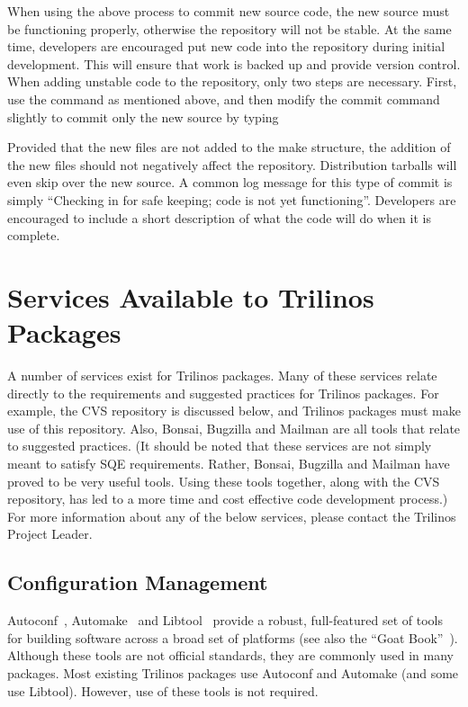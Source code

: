 \documentclass[12pt,relax]{TrilinosDevGuide}
\begin{document}
\begin{enumerate}
When using the above process to commit new source code, the new source must 
be functioning properly, otherwise the repository will not be stable.  
At the same time, developers are encouraged put new code into the repository 
during initial development.  This will ensure that work is backed up and 
provide version control.  When adding unstable code to the repository, only
two steps are necessary.  First, use the  command as 
mentioned above, and then modify the commit command slightly to commit only 
the new source by typing


Provided that the new files are not added to the make structure, the addition 
of the new files should not negatively affect the repository.  Distribution 
tarballs will even skip over the new source.  A common log message for this 
type of commit is simply ``Checking in for safe keeping; code is not yet 
functioning''.  Developers are encouraged to include a short description of 
what the code will do when it is complete.
\end{enumerate}

\section{Services Available to Trilinos Packages}
\label{Section:AvailableServices}
A number of services exist for Trilinos packages.  Many of these services 
relate directly to the requirements and suggested practices for Trilinos 
packages.  For example, the CVS repository is discussed below, and 
Trilinos packages must make use of this repository.  Also, Bonsai, Bugzilla 
and Mailman are all tools that relate to suggested practices.  (It should be 
noted that these services are not simply meant to satisfy SQE requirements.  
Rather, Bonsai, Bugzilla and Mailman have proved to be very useful tools.  
Using these tools together, along with the CVS repository, has led to a more 
time and cost effective code development process.)  For more information about 
any of the below services, please contact the Trilinos Project Leader.

\subsection{Configuration Management}
Autoconf~\cite{Autoconf},  Automake~\cite{Automake} and Libtool~\cite{Libtool} 
provide a robust, full-featured set of tools for building software across a 
broad set of platforms (see also the ``Goat Book''~\cite{GoatBook}).  Although 
these tools are not official standards, they are commonly used in many 
packages.  Most existing Trilinos packages use Autoconf and Automake (and 
some use Libtool).  However, use of these tools is not required.
\end{document}
